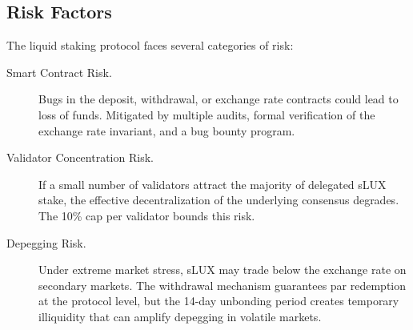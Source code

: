 \subsection{Risk Factors}

The liquid staking protocol faces several categories of risk:

\begin{description}
    \item[Smart Contract Risk.] Bugs in the deposit, withdrawal, or exchange rate contracts could lead to loss of funds. Mitigated by multiple audits, formal verification of the exchange rate invariant, and a bug bounty program.
    \item[Validator Concentration Risk.] If a small number of validators attract the majority of delegated sLUX stake, the effective decentralization of the underlying consensus degrades. The 10\% cap per validator bounds this risk.
    \item[Depegging Risk.] Under extreme market stress, sLUX may trade below the exchange rate on secondary markets. The withdrawal mechanism guarantees par redemption at the protocol level, but the 14-day unbonding period creates temporary illiquidity that can amplify depegging in volatile markets.
\end{description}

